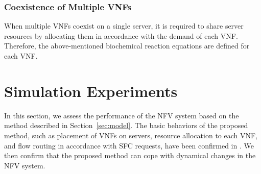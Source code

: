 \documentclass[technicalreport]{ieicej}
\begin{document}
	\subsubsection{Coexistence of Multiple VNFs}
	When multiple VNFs coexist on a single server, it is required to share server resources by allocating them in accordance with the demand of each VNF.
	Therefore, the above-mentioned biochemical reaction equations are defined for each VNF.

	\section{Simulation Experiments}
	In this section, we assess the performance of the NFV system based on the method described in Section~\ref{sec:model}.
	The basic behaviors of the proposed method, such as placement of VNFs on servers, resource allocation to each VNF, and flow routing in accordance with SFC requests, have been confirmed in \cite{kokisakata2018masterthesis}.
	We then confirm that the proposed method can cope with dynamical changes in the NFV system.
\end{document}
